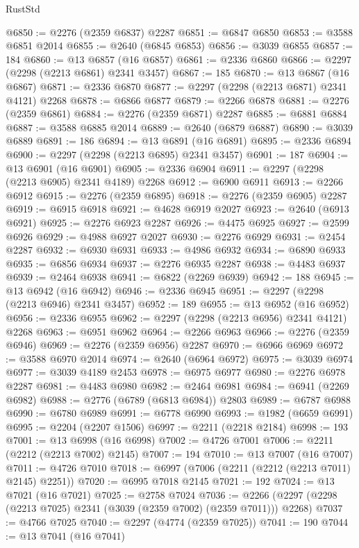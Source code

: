 \begin{lexlean}{RustStd}
\begin{coremodule}
@6850 := @2276 (@2359 @6837) @2287
@6851 := @6847 @6850
@6853 := @3588 @6851 @2014
@6855 := @2640 (@6845 @6853)
@6856 := @3039 @6855
@6857 := 184
@6860 := @13 @6857 (@16 @6857)
@6861 := @2336 @6860
@6866 := @2297 (@2298 (@2213 @6861) @2341 @3457)
@6867 := 185
@6870 := @13 @6867 (@16 @6867)
@6871 := @2336 @6870
@6877 := @2297 (@2298 (@2213 @6871) @2341 @4121) @2268
@6878 := @6866 @6877
@6879 := @2266 @6878
@6881 := @2276 (@2359 @6861)
@6884 := @2276 (@2359 @6871) @2287
@6885 := @6881 @6884
@6887 := @3588 @6885 @2014
@6889 := @2640 (@6879 @6887)
@6890 := @3039 @6889
@6891 := 186
@6894 := @13 @6891 (@16 @6891)
@6895 := @2336 @6894
@6900 := @2297 (@2298 (@2213 @6895) @2341 @3457)
@6901 := 187
@6904 := @13 @6901 (@16 @6901)
@6905 := @2336 @6904
@6911 := @2297 (@2298 (@2213 @6905) @2341 @4189) @2268
@6912 := @6900 @6911
@6913 := @2266 @6912
@6915 := @2276 (@2359 @6895)
@6918 := @2276 (@2359 @6905) @2287
@6919 := @6915 @6918
@6921 := @4628 @6919 @2027
@6923 := @2640 (@6913 @6921)
@6925 := @2276 @6923 @2287
@6926 := @4475 @6925
@6927 := @2599 @6926
@6929 := @4988 @6927 @2027
@6930 := @2276 @6929
@6931 := @2454 @2287
@6932 := @6930 @6931
@6933 := @4986 @6932
@6934 := @6890 @6933
@6935 := @6856 @6934
@6937 := @2276 @6935 @2287
@6938 := @4483 @6937
@6939 := @2464 @6938
@6941 := @6822 (@2269 @6939)
@6942 := 188
@6945 := @13 @6942 (@16 @6942)
@6946 := @2336 @6945
@6951 := @2297 (@2298 (@2213 @6946) @2341 @3457)
@6952 := 189
@6955 := @13 @6952 (@16 @6952)
@6956 := @2336 @6955
@6962 := @2297 (@2298 (@2213 @6956) @2341 @4121) @2268
@6963 := @6951 @6962
@6964 := @2266 @6963
@6966 := @2276 (@2359 @6946)
@6969 := @2276 (@2359 @6956) @2287
@6970 := @6966 @6969
@6972 := @3588 @6970 @2014
@6974 := @2640 (@6964 @6972)
@6975 := @3039 @6974
@6977 := @3039 @4189 @2453
@6978 := @6975 @6977
@6980 := @2276 @6978 @2287
@6981 := @4483 @6980
@6982 := @2464 @6981
@6984 := @6941 (@2269 @6982)
@6988 := @2776 (@6789 (@6813 @6984)) @2803
@6989 := @6787 @6988
@6990 := @6780 @6989
@6991 := @6778 @6990
@6993 := @1982 (@6659 @6991)
@6995 := @2204 (@2207 @1506)
@6997 := @2211 (@2218 @2184)
@6998 := 193
@7001 := @13 @6998 (@16 @6998)
@7002 := @4726 @7001
@7006 := @2211 (@2212 (@2213 @7002) @2145)
@7007 := 194
@7010 := @13 @7007 (@16 @7007)
@7011 := @4726 @7010
@7018 := @6997 (@7006 (@2211 (@2212 (@2213 @7011) @2145) @2251))
@7020 := @6995 @7018 @2145
@7021 := 192
@7024 := @13 @7021 (@16 @7021)
@7025 := @2758 @7024
@7036 := @2266 (@2297 (@2298 (@2213 @7025) @2341 (@3039 (@2359 @7002) (@2359 @7011))) @2268)
@7037 := @4766 @7025
@7040 := @2297 (@4774 (@2359 @7025))
@7041 := 190
@7044 := @13 @7041 (@16 @7041)

\end{coremodule}
\end{lexlean}
